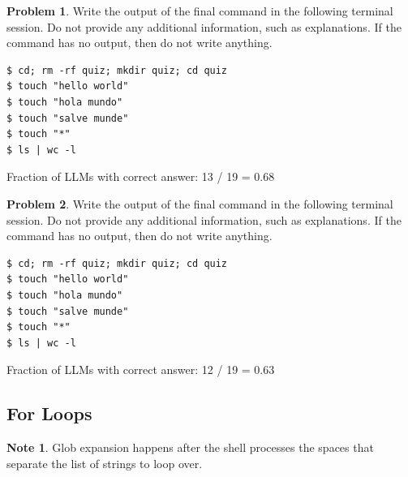 \documentclass[10pt]{article}
\theoremstyle{definition}
\newtheorem{problem}{Problem}
\newtheorem{note}{Note}
\begin{document}
\noindent\vspace{0.1in}\begin{minipage}{\textwidth}

\begin{problem}
Write the output of the final command in the following terminal session.
Do not provide any additional information,
such as explanations.
If the command has no output,
then do not write anything.

\end{problem}
\begin{lstlisting}
$ cd; rm -rf quiz; mkdir quiz; cd quiz
$ touch "hello world"
$ touch "hola mundo"
$ touch "salve munde"
$ touch "*"
$ ls | wc -l
\end{lstlisting}

Fraction of LLMs with correct answer: 13 / 19 = 0.68
\end{minipage}
\noindent\vspace{0.1in}\begin{minipage}{\textwidth}

\begin{problem}
Write the output of the final command in the following terminal session.
Do not provide any additional information,
such as explanations.
If the command has no output,
then do not write anything.

\end{problem}
\begin{lstlisting}
$ cd; rm -rf quiz; mkdir quiz; cd quiz
$ touch "hello world"
$ touch "hola mundo"
$ touch "salve munde"
$ touch "*"
$ ls | wc -l
\end{lstlisting}

Fraction of LLMs with correct answer: 12 / 19 = 0.63
\end{minipage}
\noindent\vspace{0.1in}\begin{minipage}{\textwidth}
\subsection{For Loops}

\begin{note}
Glob expansion happens after the shell processes the spaces that separate the list of strings to loop over.

\end{note}

\end{minipage}
\end{document}
